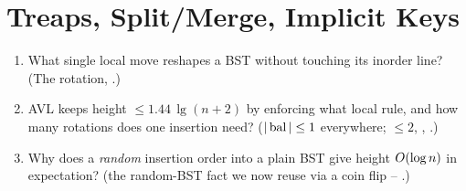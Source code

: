 \section{Treaps, Split/Merge, Implicit Keys}\label{sec:c06-treaps}

\begin{previouslybox}
\begin{enumerate}[nosep, leftmargin=1.6em]
  \item What single local move reshapes a BST without touching its inorder line? (The rotation,
        .)
  \item AVL keeps height $\le 1.44\,\lg(n+2)$ by enforcing what local rule, and how many rotations does
        one insertion need? ($|\operatorname{bal}|\le1$ everywhere; $\le2$, ,
        .)
  \item Why does a \emph{random} insertion order into a plain BST give height $O(\log n)$ in
        expectation? (the random-BST fact we now reuse via a coin flip -- .)
\end{enumerate}
\end{previouslybox}

